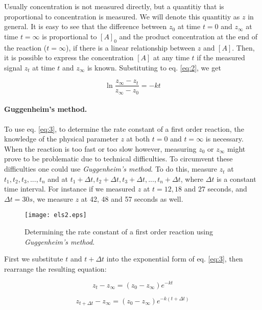 Usually concentration is not measured directly, but a quantitiy that is proportional to concentration is measured. We will denote this quantitiy as $z$ in general.
It is easy to see that the difference between $z_0$ at time $t = 0$ and $z_\infty$ at time $t = \infty$ is proportional to $[A]_0$ and the product concentration at the end of the reaction ($t = \infty$), if there is a linear relationship between $z$ and $[A]$.
Then, it is possible to express the concentration $[A]$ at any time $t$ if the measured signal $z_t$ at time $t$ and $z_{\infty}$ is known.
Substituting to eq. \ref{eq:2}, we get

\begin{equation}
\label{eq:3}
        \ln 
        \frac{z_{\infty}-z_t}{z_{\infty}-z_0}
        =
        - k
        t
\end{equation}


\paragraph{Guggenheim's method.}
To use eq. \ref{eq:3}, to determine the rate constant of a first order reaction, the knowledge of the physical parameter $z$ at both $t=0$ and $t=\infty$ is necessary.
When the reaction is too fast or too slow however, measuring $z_0$ or $z_\infty$ might prove to be problematic due to technical difficulties.
To circumvent these difficulties one could use \emph{Guggenheim's method}. To do this, measure $z_t$ at $t_1, t_2, t_3, ... , t_n$ and at $t_1+\Delta t, t_2+\Delta t, t_3+\Delta t, ... , t_n+\Delta t$, where $\Delta t$ is a constant time interval.
For instance if we measured $z$ at $t= 12, 18$ and $27$ seconds, and $\Delta t = 30 s$, we measure $z$ at 42, 48 and 57 seconds as well.

\begin{figure}[h]
\centering
\label{fig_els2}
\texttt{[image: els2.eps]}
\caption{Determining the rate constant of a first order reaction using \emph{Guggenheim's method}.}
\end{figure}

First we substitute $t$ and $t + \Delta t$ into the exponential form of eq. \ref{eq:3}, then rearrange the resulting equation:

\begin{equation}
\label{eq:4}
	z_t - z_{\infty}
	=
	(z_0 - z_{\infty}) e^{-kt}
\end{equation}

\begin{equation}
\label{eq:5}
	z_{t + \Delta t} - z_{\infty} = (z_0 - z_{\infty}) e^{-k(t+\Delta t)}
\end{equation}


